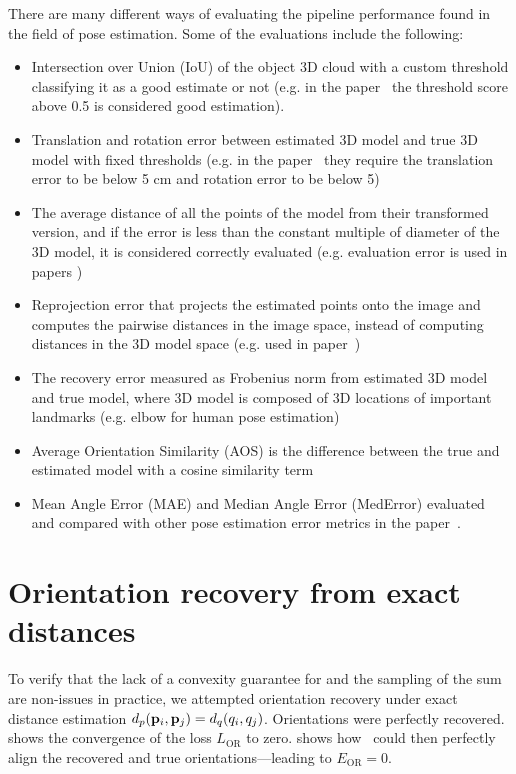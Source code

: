 There are many different ways of evaluating the pipeline performance found in the field of pose estimation. Some of the evaluations include the following:
\begin{itemize}
\item Intersection over Union (IoU) of the object 3D cloud with a custom threshold classifying it as a good estimate or not (e.g. in the paper~\cite{10.1007/s11263-014-0733-5} the threshold score above 0.5 is considered good estimation).
\item Translation and rotation error between estimated 3D model and true 3D model with fixed thresholds (e.g. in the paper~\cite{shotton2013scene} they require the translation error to be below 5 cm and rotation error to be below 5\degree)
\item The average distance of all the points of the model from their transformed version, and if the error is less than the constant multiple of diameter of the 3D model, it is considered correctly evaluated (e.g. evaluation error is used in papers \cite{10.1007/978-3-642-37331-2_42, xiang2018posecnn})
\item Reprojection error that projects the estimated points onto the image and computes the pairwise distances in the image space, instead of computing distances in the 3D model space (e.g. used in paper~\cite{xiang2018posecnn})
\item The recovery error measured as Frobenius norm from estimated 3D model and true model, where 3D model is composed of 3D locations of important landmarks (e.g. elbow for human pose estimation)~\cite{wangni2018monocular}
\item Average Orientation Similarity (AOS) is the difference between the true and estimated model with a cosine similarity term~\cite{RedondoCabrera2016PoseEE}
\item Mean Angle Error (MAE) and Median Angle Error (MedError) evaluated and compared with other pose estimation error metrics in the paper~\cite{RedondoCabrera2016PoseEE}.
\end{itemize}

\section{Orientation recovery from exact distances}\label{apx:results:orientation-recovery:exact}


To verify that the lack of a convexity guarantee for  and the sampling of the sum are non-issues in practice, we attempted orientation recovery under exact distance estimation $d_p(\mathbf{p}_i, \mathbf{p}_j) = d_q(q_i, q_j)$.
Orientations were perfectly recovered.
 shows the convergence of the loss $L_\text{OR}$ to zero.
 shows how~ could then perfectly align the recovered and true orientations---leading to $E_\text{OR} = 0$.

